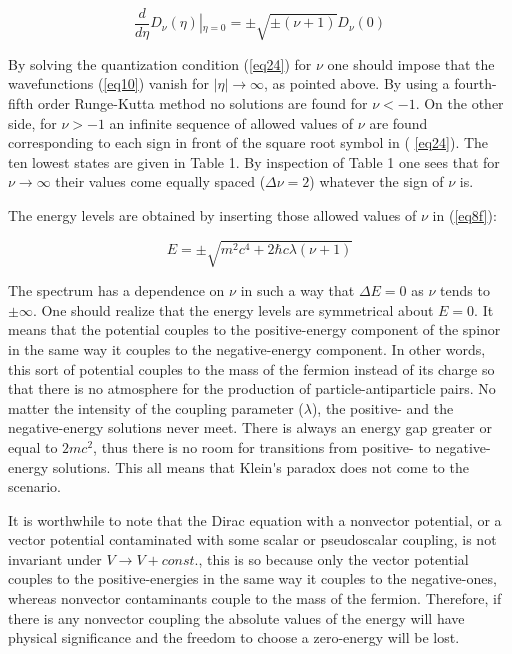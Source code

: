 \documentclass[a4paper,12pt,titlepage]{article}
\begin{document}
\begin{equation}
\frac{d}{d\eta }D_{\nu }(\eta )\left| _{\eta =0}\right. =\pm \sqrt{\pm
\left( \nu +1\right) }D_{\nu }\left( 0\right)  \label{eq24}
\end{equation}

\noindent By solving the quantization condition (\ref{eq24}) for $\nu $ one
should impose that the wavefunctions (\ref{eq10}) vanish for $|\eta
|\rightarrow \infty $, as pointed above. By using a fourth-fifth order
Runge-Kutta method \cite{fm} no solutions are found for $\nu <-1$. On the
other side, for $\nu >-1$ an infinite sequence of allowed values of $\nu $
are found corresponding to each sign in front of the square root symbol in (%
\ref{eq24}). The ten lowest states are given in Table 1. By inspection of
Table 1 one sees that for $\nu \rightarrow \infty $ their values come
equally spaced ($\Delta \nu =2$) whatever the sign of $\nu $ is.

The energy levels are obtained by inserting those allowed values of $\nu $
in (\ref{eq8f}):

\begin{equation}
E=\pm \sqrt{m^{2}c^{4}+2\hbar c\lambda \left( \nu +1\right) }  \label{eq25}
\end{equation}

\noindent The spectrum has a dependence on $\nu $ in such a way that $\Delta
E=0$ as $\nu $ tends to $\pm \infty $. One should realize that the energy
levels are symmetrical about $E=0$. It means that the potential couples to
the positive-energy component of the spinor in the same way it couples to
the negative-energy component. In other words, this sort of potential
couples to the mass of the fermion instead of its charge so that there is no
atmosphere for the production of particle-antiparticle pairs. No matter the
intensity of the coupling parameter ($\lambda $), the positive- and the
negative-energy solutions never meet. There is always an energy gap greater
or equal to $2mc^{2}$, thus there is no room for transitions from positive-
to negative-energy solutions. This all means that Klein\'{}s paradox does
not come to the scenario.

It is worthwhile to note that the Dirac equation with a nonvector potential,
or a vector potential contaminated with some scalar or pseudoscalar
coupling, is not invariant under $V\rightarrow V+const.$, this is so because
only the vector potential couples to the positive-energies in the same way
it couples to the negative-ones, whereas nonvector contaminants couple to
the mass of the fermion. Therefore, if there is any nonvector coupling the
absolute values of the energy will have physical significance and the
freedom to choose a zero-energy will be lost.
\end{document}
